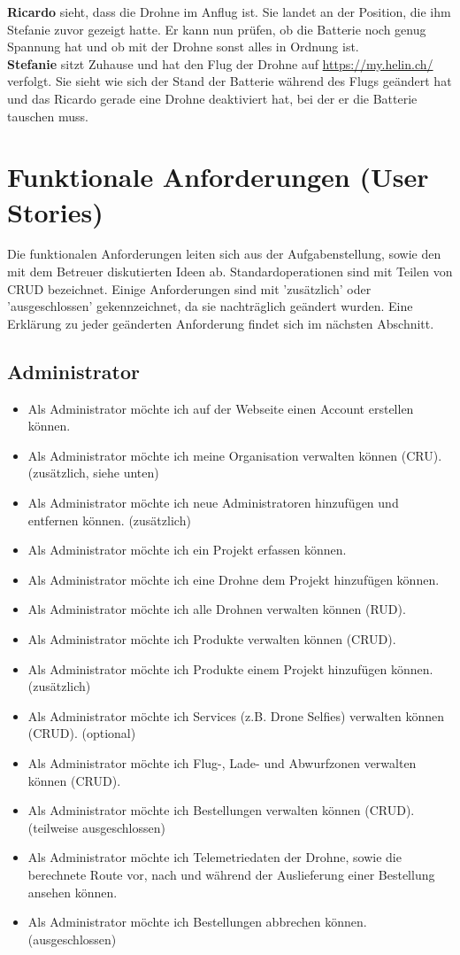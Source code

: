 \textbf{Ricardo} sieht, dass die Drohne im Anflug ist. Sie landet an der Position, die ihm Stefanie zuvor gezeigt hatte. Er kann nun prüfen, ob die Batterie noch genug Spannung hat und ob mit der Drohne sonst alles in Ordnung ist.\\

\textbf{Stefanie} sitzt Zuhause und hat den Flug der Drohne auf \url{https://my.helin.ch/} verfolgt. Sie sieht wie sich der Stand der Batterie während des Flugs geändert hat und das Ricardo gerade eine Drohne deaktiviert hat, bei der er die Batterie tauschen muss.

\newpage
\section{Funktionale Anforderungen (User Stories)}

Die funktionalen Anforderungen leiten sich aus der Aufgabenstellung, sowie den mit dem Betreuer diskutierten Ideen ab. Standardoperationen sind mit Teilen von \Gls{CRUD} bezeichnet. Einige Anforderungen sind mit 'zusätzlich' oder 'ausgeschlossen' gekennzeichnet, da sie nachträglich geändert wurden. Eine Erklärung zu jeder geänderten Anforderung findet sich im nächsten Abschnitt.

\subsection{Administrator}
\begin{itemize}
\item Als Administrator möchte ich auf der Webseite einen Account erstellen können.
\item Als Administrator möchte ich meine Organisation verwalten können (CRU). (zusätzlich, siehe unten)
\item Als Administrator möchte ich neue Administratoren hinzufügen und entfernen können. (zusätzlich)
\item Als Administrator möchte ich ein Projekt erfassen können.
\item Als Administrator möchte ich eine Drohne dem Projekt hinzufügen können.
\item Als Administrator möchte ich alle Drohnen verwalten können (RUD).
\item Als Administrator möchte ich Produkte verwalten können (CRUD).
\item Als Administrator möchte ich Produkte einem Projekt hinzufügen können. (zusätzlich)
\item Als Administrator möchte ich Services (z.B. Drone Selfies) verwalten können (CRUD). (optional)
\item Als Administrator möchte ich Flug-, Lade- und Abwurfzonen verwalten können (CRUD).
\item Als Administrator möchte ich Bestellungen verwalten können (CRUD). (teilweise ausgeschlossen)
\item Als Administrator möchte ich Telemetriedaten der Drohne, sowie die berechnete Route vor, nach und während der Auslieferung einer Bestellung ansehen können.
\item Als Administrator möchte ich Bestellungen abbrechen können. (ausgeschlossen)
\end{itemize}

